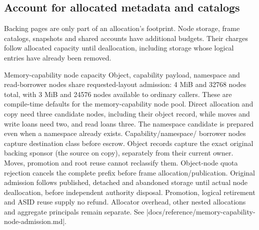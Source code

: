 \subsection{Account for allocated metadata and catalogs}

Backing pages are only part of an allocation's footprint. Node storage, frame
catalogs, snapshots and shared accounts have additional budgets. Their charges
follow allocated capacity until deallocation, including storage whose logical
entries have already been removed.

\begin{implementationdetail}{Memory-capability node capacity}
Object, capability payload, namespace and read-borrower nodes share requested-layout
admission: 4 MiB and 32768 nodes total, with 3 MiB and 24576 nodes available to
ordinary callers. These are compile-time defaults for the memory-capability node pool.
Direct allocation and copy need three candidate nodes, including their object
record, while moves and write loans need two, and read loans three. The namespace
candidate is prepared even when a namespace already exists. Capability/namespace/
borrower nodes capture destination class before escrow. Object records capture
the exact original backing sponsor (the source on copy), separately from their
current owner. Moves, promotion and root reuse cannot reclassify them. Object-node
quota rejection cancels the complete prefix before frame allocation/publication.
Original admission follows published, detached and abandoned storage until actual
node deallocation, before independent authority disposal. Promotion, logical
retirement and ASID reuse supply no refund. Allocator overhead, other nested
allocations and aggregate principals remain separate.
See \repofile|docs/reference/memory-capability-node-admission.md|.
\end{implementationdetail}

